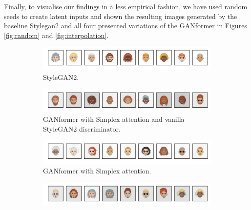 \documentclass{article}
\begin{document}
	Finally, to visualise our findings in a less empirical fashion, we have used random 
	seeds to create latent inputs and shown the resulting images generated by the baseline 
	Stylegan2 and all four presented variations of the GANformer in Figures \ref{fig:random} and 
	\ref{fig:interpolation}.
	\begin{figure}[htpb]
		\centering
		\begin{subfigure}{\linewidth}
			\includegraphics[width=\linewidth]{../src/trained_network/out_imgs/random_Stylegan2_300kimg.png}
			\vspace{-7mm}
			\caption{StyleGAN2.} 
		\end{subfigure}
		\begin{subfigure}{\linewidth}
			\includegraphics[width=\linewidth]{../src/trained_network/out_imgs/random_GANFormer_Simplex_D_Stylegan2_300kimg.png}
			\vspace{-7mm}
			\caption{GANformer with Simplex attention and vanilla StyleGAN2 discriminator.}
		\end{subfigure}
			\begin{subfigure}{\linewidth}
			\includegraphics[width=\linewidth]{../src/trained_network/out_imgs/random_GANFormer_Simplex_D_Att_300kimg.png}
			\vspace{-7mm}
			\caption{GANformer with Simplex attention.}
		\end{subfigure}
		\begin{subfigure}{\linewidth}
			\includegraphics[width=\linewidth]{../src/trained_network/out_imgs/random_GANFormer_Duplex_D_Stylegan2_300kimg.png}
			\vspace{-7mm}

\end{subfigure}
\end{figure}
\end{document}
